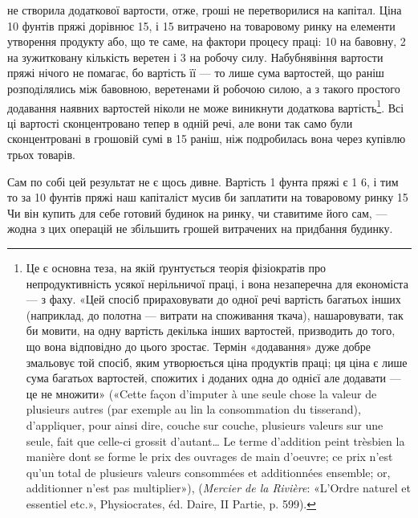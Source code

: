 \parcont{}  %
не створила додаткової вартости, отже, гроші не перетворилися
на капітал. Ціна 10 фунтів пряжі дорівнює 15, і 15
витрачено на товаровому ринку на елементи утворення
продукту або, що те саме, на фактори процесу праці: 10
на бавовну, 2 на зужитковану кількість веретен і
3 на робочу силу. Набубнявіння вартости пряжі нічого
не помагає, бо вартість її — то лише сума вартостей, що раніш
розподілялись між бавовною, веретенами й робочою силою, а з
такого простого додавання наявних вартостей ніколи не може
виникнути додаткова вартість\footnote{
Це є основна теза, на якій ґрунтується теорія фізіократів про
непродуктивність усякої нерільничої праці, і вона незаперечна для економіста
— з фаху. «Цей спосіб прираховувати до одної речі вартість багатьох
інших (наприклад, до полотна — витрати на споживання ткача), нашаровувати,
так би мовити, на одну вартість декілька інших вартостей, призводить
до того, що вона відповідно до цього зростає. Термін «додавання» дуже
добре змальовує той спосіб, яким утворюється ціна продуктів праці; ця
ціна є лише сума багатьох вартостей, спожитих і доданих одна до однієї
але додавати — це не множити» («Cette façon d’imputer à une seule chose
la valeur de plusieurs autres (par exemple au lin la consommation du tisserand),
d’appliquer, pour ainsi dire, couche sur couche, plusieurs valeurs
sur une seule, fait que celle-ci grossit d’autant\dots{} Le terme d’addition peint trèsbien
la manière dont se forme le prix des ouvrages de main d’oeuvre; ce prix
n’est qu’un total de plusieurs valeurs consommées et additionnées ensemble;
or, additionner n’est pas multiplier»), (\emph{Mercier de la Rivière}: «L’Ordre naturel
et essentiel etc.», Physiocrates, éd. Daire, II Partie, p. 599).
}. Всі ці вартості сконцентровано
тепер в одній речі, але вони так само були сконцентровані в грошовій
сумі в 15 раніш, ніж подробилась вона через
купівлю трьох товарів.

Сам по собі цей результат не є щось дивне. Вартість 1 фунта
пряжі є 1 6, і тим то за 10 фунтів пряжі наш капіталіст
мусив би заплатити на товаровому ринку 15
Чи він купить для себе готовий будинок на ринку, чи ставитиме
його сам, — жодна з цих операцій не збільшить грошей витрачених
на придбання будинку.

